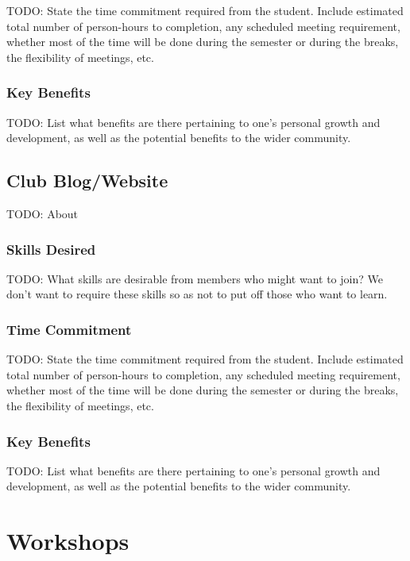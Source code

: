 \documentclass[11pt,fleqn]{article}
\begin{document}
TODO: State the time commitment required from the student.  Include estimated total number of person-hours to completion, any scheduled meeting requirement, whether most of the time will be done during the semester or during the breaks, the flexibility of meetings, etc.

\subsubsection*{Key Benefits}

TODO: List what benefits are there pertaining to one's personal growth and development, as well as the potential benefits to the wider community.

\newpage

\subsection{Club Blog/Website}

TODO: About

\subsubsection*{Skills Desired}

TODO: What skills are desirable from members who might want to join?  We don't want to require these skills so as not to put off those who want to learn.

\subsubsection*{Time Commitment}

TODO: State the time commitment required from the student.  Include estimated total number of person-hours to completion, any scheduled meeting requirement, whether most of the time will be done during the semester or during the breaks, the flexibility of meetings, etc.

\subsubsection*{Key Benefits}

TODO: List what benefits are there pertaining to one's personal growth and development, as well as the potential benefits to the wider community.

\newpage

\section{Workshops}
\end{document}
